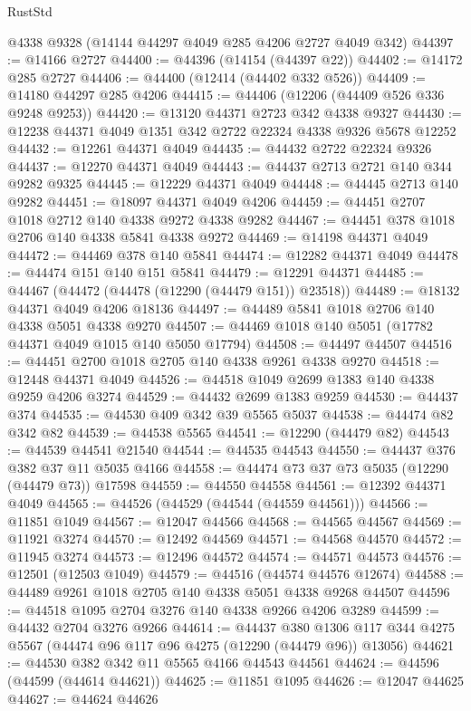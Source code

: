 \begin{lexlean}{RustStd}
\begin{coremodule}
{\begin{coremodule}
{{{{{{{{{{{{{{{{{{{{{{{{{{{{{{{{{{{{{{{{{{{{{{{{{{    @4338
    @9328
    (@14144 @44297 @4049 @285 @4206 @2727 @4049 @342)
@44397 := @14166 @2727
@44400 := @44396 (@14154 (@44397 @22))
@44402 := @14172 @285 @2727
@44406 := @44400 (@12414 (@44402 @332 @526))
@44409 := @14180 @44297 @285 @4206
@44415 := @44406 (@12206 (@44409 @526 @336 @9248 @9253))
@44420 := @13120 @44371 @2723 @342 @4338 @9327
@44430 := @12238 @44371 @4049 @1351 @342 @2722 @22324 @4338 @9326 @5678 @12252
@44432 := @12261 @44371 @4049
@44435 := @44432 @2722 @22324 @9326
@44437 := @12270 @44371 @4049
@44443 := @44437 @2713 @2721 @140 @344 @9282 @9325
@44445 := @12229 @44371 @4049
@44448 := @44445 @2713 @140 @9282
@44451 := @18097 @44371 @4049 @4206
@44459 := @44451 @2707 @1018 @2712 @140 @4338 @9272 @4338 @9282
@44467 := @44451 @378 @1018 @2706 @140 @4338 @5841 @4338 @9272
@44469 := @14198 @44371 @4049
@44472 := @44469 @378 @140 @5841
@44474 := @12282 @44371 @4049
@44478 := @44474 @151 @140 @151 @5841
@44479 := @12291 @44371
@44485 := @44467 (@44472 (@44478 (@12290 (@44479 @151)) @23518))
@44489 := @18132 @44371 @4049 @4206 @18136
@44497 := @44489 @5841 @1018 @2706 @140 @4338 @5051 @4338 @9270
@44507 := @44469 @1018 @140 @5051 (@17782 @44371 @4049 @1015 @140 @5050 @17794)
@44508 := @44497 @44507
@44516 := @44451 @2700 @1018 @2705 @140 @4338 @9261 @4338 @9270
@44518 := @12448 @44371 @4049
@44526 := @44518 @1049 @2699 @1383 @140 @4338 @9259 @4206 @3274
@44529 := @44432 @2699 @1383 @9259
@44530 := @44437 @374
@44535 := @44530 @409 @342 @39 @5565 @5037
@44538 := @44474 @82 @342 @82
@44539 := @44538 @5565
@44541 := @12290 (@44479 @82)
@44543 := @44539 @44541 @21540
@44544 := @44535 @44543
@44550 := @44437 @376 @382 @37 @11 @5035 @4166
@44558 := @44474 @73 @37 @73 @5035 (@12290 (@44479 @73)) @17598
@44559 := @44550 @44558
@44561 := @12392 @44371 @4049
@44565 := @44526 (@44529 (@44544 (@44559 @44561)))
@44566 := @11851 @1049
@44567 := @12047 @44566
@44568 := @44565 @44567
@44569 := @11921 @3274
@44570 := @12492 @44569
@44571 := @44568 @44570
@44572 := @11945 @3274
@44573 := @12496 @44572
@44574 := @44571 @44573
@44576 := @12501 (@12503 @1049)
@44579 := @44516 (@44574 @44576 @12674)
@44588 := @44489 @9261 @1018 @2705 @140 @4338 @5051 @4338 @9268 @44507
@44596 := @44518 @1095 @2704 @3276 @140 @4338 @9266 @4206 @3289
@44599 := @44432 @2704 @3276 @9266
@44614 := @44437
    @380
    @1306
    @117
    @344
    @4275
    @5567
    (@44474 @96 @117 @96 @4275 (@12290 (@44479 @96)) @13056)
@44621 := @44530 @382 @342 @11 @5565 @4166 @44543 @44561
@44624 := @44596 (@44599 (@44614 @44621))
@44625 := @11851 @1095
@44626 := @12047 @44625
@44627 := @44624 @44626
}}}}}}}}}}}}}}}}}}}}}}}}}}}}}}}}}}}}}}}}}}}}}}}}}}
\end{coremodule}}
\end{coremodule}
\end{lexlean}
